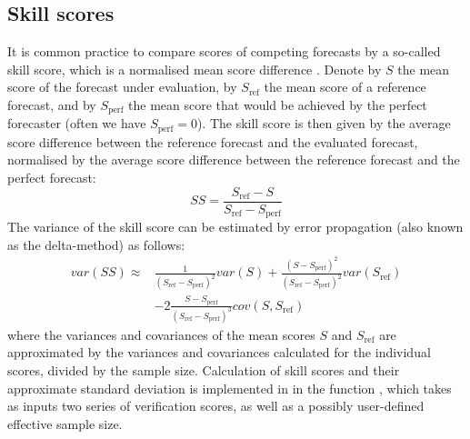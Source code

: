 \documentclass[article]{jss}\usepackage{graphicx, color}
\begin{document}
\subsection{Skill scores}

It is common practice to compare scores of competing forecasts by a so-called skill score, which is a normalised mean score difference \citep{wilks2011statistical}.
Denote by $S$ the mean score of the forecast under evaluation, by $S_{\text{ref}}$ the mean score of a reference forecast, and by $S_{\text{perf}}$ the mean score that would be achieved by the perfect forecaster (often we have $S_{\text{perf}}=0$).
The skill score is then given by the average score difference between the reference forecast and the evaluated forecast, normalised by the average score difference between the reference forecast and the perfect forecast:
%
\begin{equation}
SS = \frac{S_{\text{ref}} - S}{S_{\text{ref}} - S_{\text{perf}}}
\end{equation}
%
The variance of the skill score can be estimated by error propagation (also known as the delta-method) as follows:
%
\begin{align}
var(SS) \approx & \frac{1}{(S_{\text{ref}} - S_{\text{perf}})^2} var(S) + \frac{(S - S_{\text{perf}})^2}{(S_{\text{ref}}-S_{\text{perf}})^2} var(S_{\text{ref}})\nonumber\\
& - 2 \frac{S-S_{\text{perf}}}{(S_{\text{ref}}-S_{\text{perf}})^3} cov(S, S_{\text{ref}})
\end{align}
%
where the variances and covariances of the mean scores $S$ and $S_{\text{ref}}$ are approximated by the variances and covariances calculated for the individual scores, divided by the sample size.
Calculation of skill scores and their approximate standard deviation is implemented in  in the function , which takes as inputs two series of verification scores, as well as a possibly user-defined effective sample size.
\end{document}
